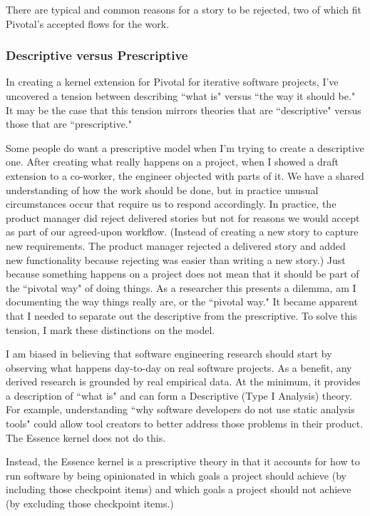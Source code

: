 \documentclass[preprint,12pt,3p]{elsarticle}
\begin{document}
There are typical and common reasons for a story to be rejected, two of which fit Pivotal's accepted flows for the work. 


\subsubsection{Descriptive versus Prescriptive}

In creating a kernel extension for Pivotal for iterative software projects, I've uncovered a tension between describing ``what is" versus ``the way it should be." It may be the case that this tension mirrors theories that are ``descriptive" versus those that are ``prescriptive." 

Some people do want a prescriptive model when I'm trying to create a descriptive one. After creating what really happens on a project, when I showed a draft extension to a co-worker, the engineer objected with parts of it. We have a shared understanding of how the work should be done, but in practice unusual circumstances occur that require us to respond accordingly. In practice, the product manager did reject delivered stories but not for reasons we would accept as part of our agreed-upon workflow. (Instead of creating a new story to capture new requirements. The product manager rejected a delivered story and added new functionality because rejecting was easier than writing a new story.) Just because something happens on a project does not mean that it should be part of the ``pivotal way" of doing things. As a researcher this presents a dilemma, am I documenting the way things really are, or the ``pivotal way."  It became apparent that I needed to separate out the descriptive from the  prescriptive. To solve this tension, I mark these distinctions on the model. 

I am biased in believing that software engineering research should start by observing what happens day-to-day on real software projects. As a benefit, any derived research is grounded by real empirical data. At the minimum, it provides a description of ``what is" and can form a Descriptive (Type I Analysis) theory. For example, understanding ``why software developers do not use static analysis tools" \cite{Johnson2013} could allow tool creators to better address those problems in their product. The Essence kernel does not do this. 

Instead, the Essence kernel is a prescriptive theory in that it accounts for how to run software by being opinionated in which goals a project should achieve (by including those checkpoint items) and which goals a project should not achieve (by excluding those checkpoint items.)
\end{document}
